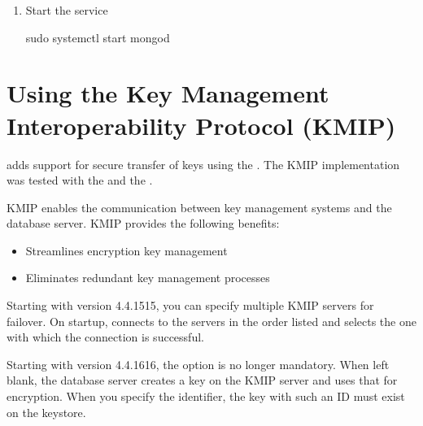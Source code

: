 \documentclass[letterpaper,10pt,english]{sphinxmanual}
\begin{document}
\begin{enumerate}
\item {} 
\sphinxAtStartPar
Start the  service

\begin{sphinxVerbatim}[commandchars=\\\{\}]
\PYGZdl{} sudo systemctl start mongod
\end{sphinxVerbatim}

\end{enumerate}


\section{Using the Key Management Interoperability Protocol (KMIP)}
\label{\detokenize{kmip:using-the-key-management-interoperability-protocol-kmip}}\label{\detokenize{kmip:kmip}}\label{\detokenize{kmip::doc}}
\sphinxAtStartPar
{} adds support for secure transfer of keys using the . The KMIP implementation was tested with the  and the .

\sphinxAtStartPar
KMIP enables the communication between key management systems and the database server. KMIP provides the following benefits:
\begin{itemize}
\item {} 
\sphinxAtStartPar
Streamlines encryption key management

\item {} 
\sphinxAtStartPar
Eliminates redundant key management processes

\end{itemize}

\sphinxAtStartPar
Starting with version 4.4.15\sphinxhyphen{}15, you can specify multiple KMIP servers for failover. On startup,  connects to the servers in the order listed and selects the one with which the connection is successful.

\sphinxAtStartPar
Starting with version 4.4.16\sphinxhyphen{}16, the  option is no longer mandatory. When left blank, the database server creates a key on the KMIP server and uses that for encryption. When you specify the identifier, the key with such an ID must exist on the keystore.
\end{document}
